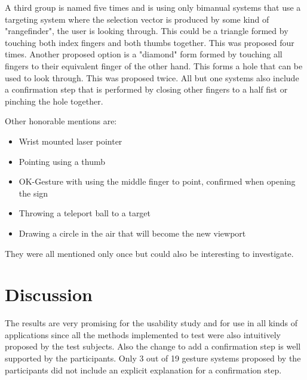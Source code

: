 A third group is named five times and is using only bimanual systems that use a targeting system where the selection vector is produced by some kind of "rangefinder", the user is looking through. This could be a triangle formed by touching both index fingers and both thumbs together. This was proposed four times. Another proposed option is a "diamond" form formed by touching all fingers to their equivalent finger of the other hand. This forms a hole that can be used to look through. This was proposed twice. All but one systems also include a confirmation step that is performed by closing other fingers to a half fist or pinching the hole together.

Other honorable mentions are:
\begin{itemize}
    \item Wrist mounted laser pointer
    \item Pointing using a thumb
    \item OK-Gesture with using the middle finger to point, confirmed when opening the sign
    \item Throwing a teleport ball to a target
    \item Drawing a circle in the air that will become the new viewport
\end{itemize}

They were all mentioned only once but could also be interesting to investigate.

\section{Discussion}
The results are very promising for the usability study and for use in all kinds of applications since all the methods implemented to test were also intuitively proposed by the test subjects. Also the change to add a confirmation step is well supported by the participants. Only 3 out of 19 gesture systems proposed by the participants did not include an explicit explanation for a confirmation step. 
